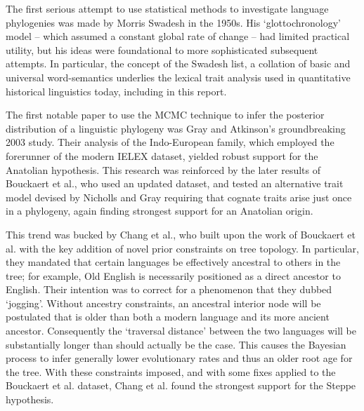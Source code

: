 \documentclass[10pt,journal,compsoc]{IEEEtran}
\begin{document}
The first serious attempt to use statistical methods to investigate language phylogenies was made by Morris Swadesh in the 1950s. His `glottochronology' model -- which assumed a constant global rate of change -- had limited practical utility, but his ideas were foundational to more sophisticated subsequent attempts.\cite{swadesh1955towards} In particular, the concept of the Swadesh list, a collation of basic and universal word-semantics underlies the lexical trait analysis used in quantitative historical linguistics today, including in this report.

The first notable paper to use the MCMC technique to infer the posterior distribution of a linguistic phylogeny was Gray and Atkinson's groundbreaking 2003 study. Their analysis of the Indo-European family, which employed the forerunner of the modern IELEX dataset, yielded robust support for the Anatolian hypothesis.\cite{gray2003language} This research was reinforced by the later results of Bouckaert et al.\cite{bouckaert2012mapping}\cite{bouckaert2013correction}, who used an updated dataset, and tested an alternative trait model devised by Nicholls and Gray\cite{nicholls2008dated} requiring that cognate traits arise just once in a phylogeny, again finding strongest support for an Anatolian origin.

This trend was bucked by Chang et al., who built upon the work of Bouckaert et al. with the key addition of novel prior constraints on tree topology.\cite{chang2015ancestry} In particular, they mandated that certain languages be effectively ancestral to others in the tree; for example, Old English is necessarily positioned as a direct ancestor to English. Their intention was to correct for a phenomenon that they dubbed `jogging'. Without ancestry constraints, an ancestral interior node will be postulated that is older than both a modern language and its more ancient ancestor. Consequently the `traversal distance' between the two languages will be substantially longer than should actually be the case. This causes the Bayesian process to infer generally lower evolutionary rates and thus an older root age for the tree. With these constraints imposed, and with some fixes applied to the Bouckaert et al. dataset, Chang et al. found the strongest support for the Steppe hypothesis.
\end{document}
